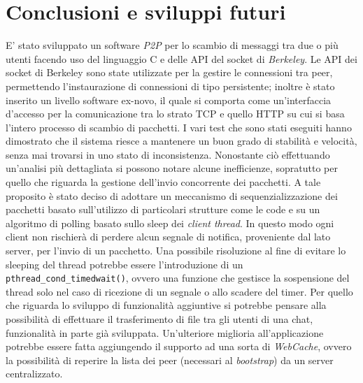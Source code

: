 \chapter{Conclusioni e sviluppi futuri}\label{conclusioni}
E' stato sviluppato un software \textit{P2P} per lo scambio di messaggi tra due o più utenti facendo uso del linguaggio C e delle API del socket di \textit{Berkeley}. Le API dei socket di Berkeley sono state utilizzate per la gestire le connessioni tra peer, permettendo l'instaurazione di connessioni di tipo persistente; inoltre è stato inserito un livello software ex-novo, il quale si comporta come un'interfaccia d'accesso per la comunicazione tra lo strato TCP e quello HTTP su cui si basa l'intero processo di scambio di pacchetti.
I vari test che sono stati eseguiti hanno dimostrato che il sistema riesce a mantenere un buon grado di stabilità e velocità, senza mai trovarsi in uno stato di inconsistenza. Nonostante ciò effettuando un'analisi più dettagliata si possono notare alcune inefficienze, sopratutto per quello che riguarda la gestione dell'invio concorrente dei pacchetti. A tale proposito è stato deciso di adottare un meccanismo di sequenzializzazione dei pacchetti basato sull'utilizzo di particolari strutture come le code e su un algoritmo di polling basato sullo sleep dei \textit{client thread}.
In questo modo ogni client non rischierà di perdere alcun segnale di notifica, proveniente dal lato server, per l'invio di un pacchetto. Una possibile risoluzione al fine di evitare lo sleeping del thread potrebbe essere l'introduzione di un \texttt{pthread\_cond\_timedwait()}, ovvero una funzione che gestisce la sospensione del thread solo nel caso di ricezione di un segnale o allo scadere del timer. Per quello che riguarda lo sviluppo di funzionalità aggiuntive si potrebbe pensare alla possibilità di effettuare il trasferimento di file tra gli utenti di una chat, funzionalità in parte già sviluppata. Un'ulteriore miglioria all'applicazione potrebbe essere fatta aggiungendo il supporto ad una sorta di \textit{WebCache}, ovvero la possibilità di reperire la lista dei peer (necessari al \textit{bootstrap}) da un server centralizzato.